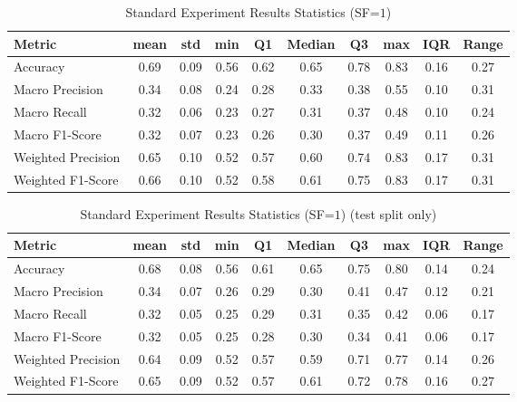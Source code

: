 \begin{table}[h]
\caption{Standard Experiment Results Statistics (SF=$1$)}
\label{tab:sf1_Standard_Results_Statistics}
\begin{tabular}{|l|c|c|c|c|c|c|c|c|c|}
\toprule
Metric & mean & std & min & Q1 & Median & Q3 & max & IQR & Range \\
\midrule
Accuracy & 0.69 & 0.09 & 0.56 & 0.62 & 0.65 & 0.78 & 0.83 & 0.16 & 0.27 \\
Macro Precision & 0.34 & 0.08 & 0.24 & 0.28 & 0.33 & 0.38 & 0.55 & 0.10 & 0.31 \\
Macro Recall & 0.32 & 0.06 & 0.23 & 0.27 & 0.31 & 0.37 & 0.48 & 0.10 & 0.24 \\
Macro F1-Score & 0.32 & 0.07 & 0.23 & 0.26 & 0.30 & 0.37 & 0.49 & 0.11 & 0.26 \\
Weighted Precision & 0.65 & 0.10 & 0.52 & 0.57 & 0.60 & 0.74 & 0.83 & 0.17 & 0.31 \\
Weighted F1-Score & 0.66 & 0.10 & 0.52 & 0.58 & 0.61 & 0.75 & 0.83 & 0.17 & 0.31 \\
\bottomrule
\end{tabular}
\end{table}

\begin{table}[h]
\caption{Standard Experiment Results Statistics (SF=$1$) (test split only)}
\label{tab:sf1_test_Standard_Results_Statistics}
\begin{tabular}{|l|c|c|c|c|c|c|c|c|c|}
\toprule
Metric & mean & std & min & Q1 & Median & Q3 & max & IQR & Range \\
\midrule
Accuracy & 0.68 & 0.08 & 0.56 & 0.61 & 0.65 & 0.75 & 0.80 & 0.14 & 0.24 \\
Macro Precision & 0.34 & 0.07 & 0.26 & 0.29 & 0.30 & 0.41 & 0.47 & 0.12 & 0.21 \\
Macro Recall & 0.32 & 0.05 & 0.25 & 0.29 & 0.31 & 0.35 & 0.42 & 0.06 & 0.17 \\
Macro F1-Score & 0.32 & 0.05 & 0.25 & 0.28 & 0.30 & 0.34 & 0.41 & 0.06 & 0.17 \\
Weighted Precision & 0.64 & 0.09 & 0.52 & 0.57 & 0.59 & 0.71 & 0.77 & 0.14 & 0.26 \\
Weighted F1-Score & 0.65 & 0.09 & 0.52 & 0.57 & 0.61 & 0.72 & 0.78 & 0.16 & 0.27 \\
\bottomrule
\end{tabular}
\end{table}

